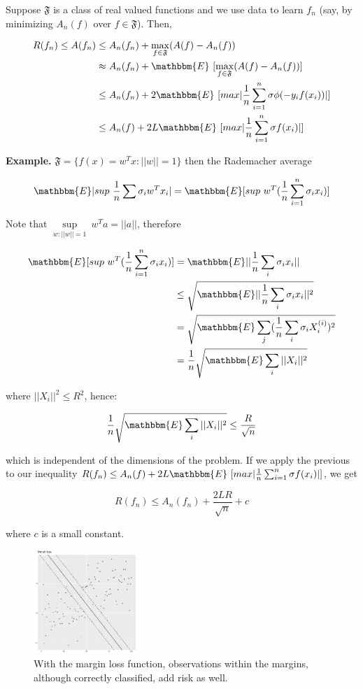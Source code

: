 \documentclass[11pt, english]{article}
\begin{document}
Suppose $\mathfrak{F}$ is a class of real valued functions and we use data to learn $f_n$ (say, by minimizing $A_n(f)$ over $f \in \mathfrak{F}$). Then,
 
\begin{align*}
	 R(f_n)\leq A(f_n) &\leq A_n(f_n) + \max_{f \in \mathfrak{F}}(A(f) - A_n(f))\\
	 & \approx A_n(f_n) + \mathbbm{E}\ [\max_{f \in \mathfrak{F}}(A(f) - A_n(f))]\\
	 & \leq A_n(f_n) + 2 \mathbbm{E}\ [max |\frac{1}{n} \sum_{i=1}^{n}\sigma \phi(-y_i f(x_i))|]\\
	 & \leq A_n(f) + 2L \mathbbm{E}\ [max |\frac{1}{n} \sum_{i=1}^{n}\sigma f(x_i)|]
\end{align*}
 
\textbf{Example.} $\mathfrak{F} = \{f(x) = w^Tx : ||w|| = 1\}$ then the Rademacher average
 
$$\mathbbm{E} |sup \ \frac{1}{n} \sum \sigma_i w^T x_i| = \mathbbm{E} [sup \ w^T(\frac{1}{n} \sum_{i=1}^{n} \sigma_i x_i)]$$
 
Note that $\sup\limits_{w:||w||=1} \ w^T a = ||a||$, therefore
 
\begin{align*}
	 \mathbbm{E} [sup \ w^T(\frac{1}{n} \sum_{i=1}^{n} \sigma_i x_i)] &=\mathbbm{E} ||\frac{1}{n} \sum_i \sigma_i x_i||\\
	 &\leq \sqrt{\mathbbm{E}||\frac{1}{n} \sum_i \sigma_i x_i||^2}\\
	 &= \sqrt{\mathbbm{E} \sum_j (\frac{1}{n} \sum_i \sigma_i X_i^{(i)})^2}\\
	 &= \frac{1}{n} \sqrt{\mathbbm{E} \sum_i ||X_i||^2}
\end{align*}
 
where $||X_i||^2 \leq R^2$, hence:
 
$$\frac{1}{n} \sqrt{\mathbbm{E} \sum_i ||X_i||^2} \leq \frac{R}{\sqrt{n}}$$
 
which is independent of the dimensions of the problem. If we apply the previous to our inequality $R(f_n) \leq A_n(f) + 2L \mathbbm{E}\ [max |\frac{1}{n} \sum_{i=1}^{n}\sigma f(x_i)|]$, we get
 
$$R(f_n) \leq A_n(f_n) + \frac{2LR}{\sqrt{n}} + c$$
 
where $c$ is a small constant.\\
 
 
\begin{figure}
 	\centering
 	\includegraphics[width=0.35\textwidth]{marginloss.pdf}
 	\caption{\small With the margin loss function, observations within the margins, although correctly classified, add risk as well.}
\end{figure}
 
\end{document}
